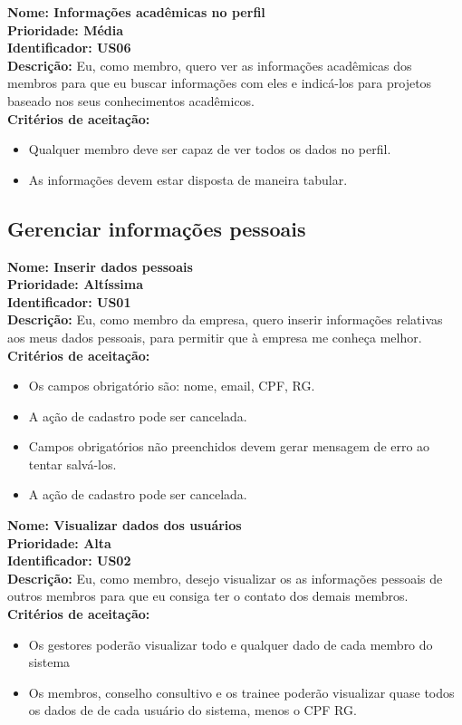 \begin{anexosenv}
\textbf{Nome: Informações acadêmicas no perfil\\
    Prioridade: Média\\
    Identificador: US06\\
    Descrição:} Eu, como membro, quero ver as informações acadêmicas dos membros para que eu buscar informações com eles e indicá-los para projetos baseado nos seus conhecimentos acadêmicos.\\
\textbf{Critérios de aceitação:}        
\begin{itemize}
    \item Qualquer membro deve ser capaz de ver todos os dados no perfil.
    \item As informações devem estar disposta de maneira tabular.
\end{itemize}

\subsection{Gerenciar informações pessoais}

\textbf{Nome: Inserir dados pessoais\\
    Prioridade: Altíssima\\
    Identificador: US01\\
    Descrição:} Eu, como membro da empresa, quero inserir informações relativas aos meus dados pessoais, para permitir que à empresa me conheça melhor.\\
\textbf{Critérios de aceitação:}
\begin{itemize}
    \item Os campos obrigatório são: nome, email, CPF, RG.
    \item A ação de cadastro pode ser cancelada.
    \item Campos obrigatórios não preenchidos devem gerar mensagem de erro ao tentar salvá-los.
    \item A ação de cadastro pode ser cancelada.
\end{itemize}

\textbf{Nome: Visualizar dados dos usuários\\
    Prioridade: Alta\\
    Identificador: US02\\
    Descrição:} Eu, como membro, desejo visualizar os as informações pessoais de outros membros para que eu consiga ter o contato dos demais membros.\\
\textbf{Critérios de aceitação:}
\begin{itemize}
    \item Os gestores poderão visualizar todo e qualquer dado de cada membro do sistema
    \item Os membros, conselho consultivo e os trainee poderão visualizar quase todos os dados de de cada usuário do sistema, menos o CPF RG.
\end{itemize}


\end{anexosenv}
